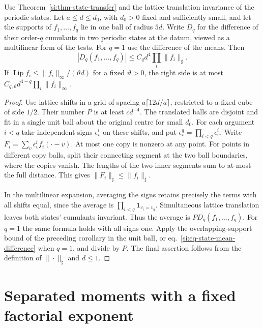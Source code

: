 \documentclass[11pt,letterpaper,reqno]{amsart}
\makeatletter
\numberwithin{equation}{section}
\renewcommand{\eqref}[1]{\textup{eq.~\ref{#1}}}
\theoremstyle{definition}
\newcommand{\ms@majorstart}{%
  \pushQED{\qed}\renewcommand{\qedsymbol}{$\blacksquare\square$}}
\newenvironment{corollary}[1][]{\ms@majorstart\ms@corollary[#1]}
  {\popQED\endms@corollary}
\theoremstyle{remark}
\makeatother
\begin{document}
\begin{samepage}
\begin{corollary}[Local differences between states]
\label{si:cor-local-state-differences}
Use Theorem~\ref{si:thm-state-transfer} and the lattice translation
invariance of the periodic states. Let $a\le d\le d_0$, with
$d_0>0$ fixed and sufficiently small, and let the supports of
$f_1,\ldots,f_q$ lie in one ball of radius $5d$. Write $D_q$ for
the difference of their order-$q$ cumulants in two periodic
states at the datum, viewed as a multilinear form of the tests.
For $q=1$ use the difference of the means. Then
\[
 |D_q(f_1,\ldots,f_q)|\le C_q d^4\prod_i\|f_i\|_\sharp.
\]
If $\operatorname{Lip} f_i\le\|f_i\|_\infty/(\vartheta d)$ for
a fixed $\vartheta>0$, the right side is at most
$C_{q,\vartheta}d^{4-q}\prod_i\|f_i\|_\infty$.
\end{corollary}
\end{samepage}
\begin{proof}
Use lattice shifts in a grid of spacing $a\lceil12d/a\rceil$,
restricted to a fixed cube of side $1/2$. Their number $P$ is
at least $c d^{-4}$. The translated balls are disjoint and fit in
a single unit ball about the original centre for small $d_0$.
For each argument $i<q$ take independent signs $\epsilon_v^i$ on
these shifts, and put $\epsilon_v^q=\prod_{i<q}\epsilon_v^i$.
Write $F_i=\sum_v\epsilon_v^i f_i(\cdot-v)$. At most one copy is
nonzero at any point. For points in different copy balls, split
their connecting segment at the two ball boundaries, where the
copies vanish. The lengths of the two inner segments sum to at
most the full distance. This gives $\|F_i\|_\sharp\le\|f_i\|_\sharp$.

In the multilinear expansion, averaging the signs retains precisely
the terms with all shifts equal, since the average is
$\prod_{i<q}\mathbf1_{v_i=v_q}$. Simultaneous lattice translation
leaves both states' cumulants invariant. Thus the average is
$P D_q(f_1,\ldots,f_q)$. For $q=1$ the same formula holds with all
signs one. Apply the overlapping-support bound of the preceding
corollary in the unit ball, or \eqref{si:eq-state-mean-difference}
when $q=1$, and divide by $P$. The final assertion follows from
the definition of $\|\cdot\|_\sharp$ and $d\le1$.
\end{proof}


\section{Separated moments with a fixed factorial exponent}
\label{si:sec-graded}
\end{document}
